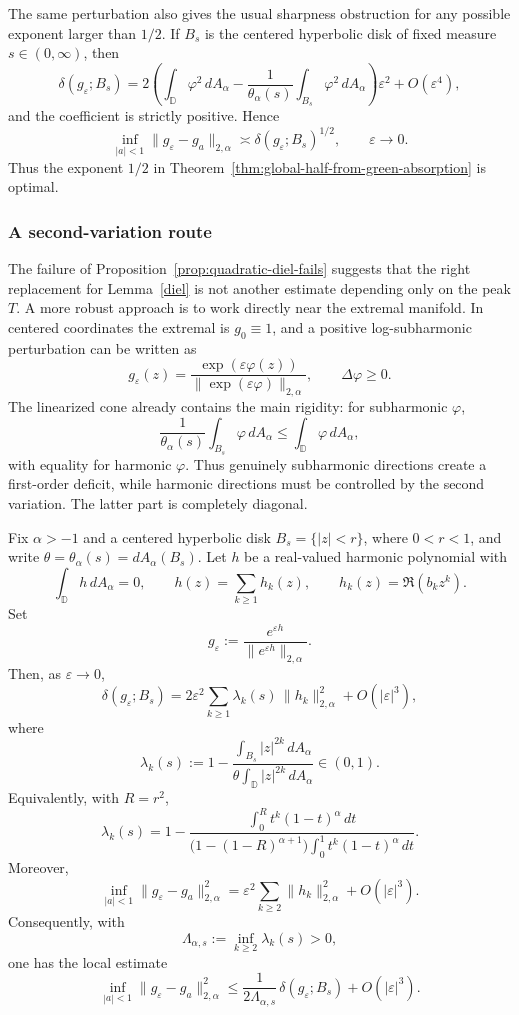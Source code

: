 \documentclass[a4paper,10pt]{amsart}
\newcommand{\D}{\mathbb{D}}
\begin{document}
The same perturbation also gives the usual sharpness obstruction for any
possible exponent larger than $1/2$. If $B_s$ is the centered hyperbolic disk
of fixed measure $s\in(0,\infty)$, then
\[
\delta(g_\varepsilon;B_s)
=
2\left(
\int_\D\varphi^2\,dA_\alpha
-
\frac{1}{\theta_\alpha(s)}\int_{B_s}\varphi^2\,dA_\alpha
\right)\varepsilon^2
+O(\varepsilon^4),
\]
and the coefficient is strictly positive. Hence
\[
\inf_{|a|<1}\|g_\varepsilon-g_a\|_{2,\alpha}
\asymp
\delta(g_\varepsilon;B_s)^{1/2},
\qquad \varepsilon\to0.
\]
Thus the exponent $1/2$ in
Theorem~\ref{thm:global-half-from-green-absorption} is optimal.

\subsubsection*{A second-variation route}

The failure of Proposition~\ref{prop:quadratic-diel-fails} suggests that the
right replacement for Lemma~\ref{diel} is not another estimate depending only
on the peak $T$. A more robust approach is to work directly near the extremal
manifold. In centered coordinates the extremal is $g_0\equiv1$, and a positive
log-subharmonic perturbation can be written as
\[
g_\varepsilon(z)=
\frac{\exp(\varepsilon\varphi(z))}
{\|\exp(\varepsilon\varphi)\|_{2,\alpha}},
\qquad \Delta\varphi\ge0.
\]
The linearized cone already contains the main rigidity: for subharmonic
$\varphi$,
\[
\frac1{\theta_\alpha(s)}\int_{B_s}\varphi\,dA_\alpha
\le
\int_\D\varphi\,dA_\alpha,
\]
with equality for harmonic $\varphi$. Thus genuinely subharmonic directions
create a first-order deficit, while harmonic directions must be controlled by
the second variation. The latter part is completely diagonal.

\begin{numprop}\label{prop:harmonic-second-variation}
Fix $\alpha>-1$ and a centered hyperbolic disk $B_s=\{|z|<r\}$, where
$0<r<1$, and write $\theta=\theta_\alpha(s)=dA_\alpha(B_s)$.
Let $h$ be a real-valued harmonic polynomial with
\[
\int_\D h\,dA_\alpha=0,
\qquad
h(z)=\sum_{k\ge1} h_k(z),
\qquad
h_k(z)=\Re(b_k z^k).
\]
Set
\[
g_\varepsilon:=
\frac{e^{\varepsilon h}}{\|e^{\varepsilon h}\|_{2,\alpha}}.
\]
Then, as $\varepsilon\to0$,
\[
\delta(g_\varepsilon;B_s)
=
2\varepsilon^2
\sum_{k\ge1}\lambda_k(s)\,\|h_k\|_{2,\alpha}^2
+O(|\varepsilon|^3),
\]
where
\[
\lambda_k(s)
:=
1-
\frac{\displaystyle\int_{B_s}|z|^{2k}\,dA_\alpha}
{\displaystyle\theta\int_\D |z|^{2k}\,dA_\alpha}
\in(0,1).
\]
Equivalently, with $R=r^2$,
\[
\lambda_k(s)
=
1-
\frac{\displaystyle\int_0^R t^k(1-t)^\alpha\,dt}
{\displaystyle\bigl(1-(1-R)^{\alpha+1}\bigr)
\int_0^1 t^k(1-t)^\alpha\,dt}.
\]
Moreover,
\[
\inf_{|a|<1}\|g_\varepsilon-g_a\|_{2,\alpha}^2
=
\varepsilon^2\sum_{k\ge2}\|h_k\|_{2,\alpha}^2
+O(|\varepsilon|^3).
\]
Consequently, with
\[
\Lambda_{\alpha,s}:=\inf_{k\ge2}\lambda_k(s)>0,
\]
one has the local estimate
\[
\inf_{|a|<1}\|g_\varepsilon-g_a\|_{2,\alpha}^2
\le
\frac{1}{2\Lambda_{\alpha,s}}\,
\delta(g_\varepsilon;B_s)
+O(|\varepsilon|^3).
\]
\end{numprop}
\end{document}
